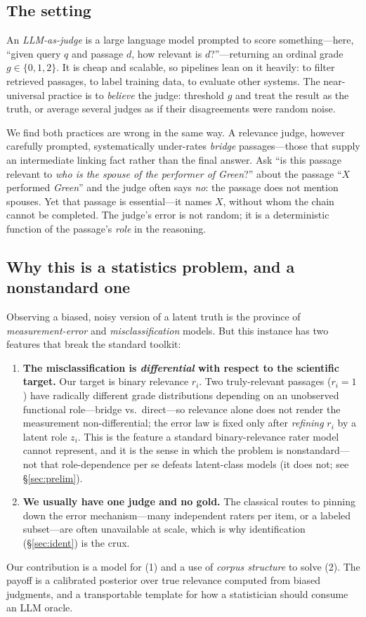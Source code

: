 \documentclass[11pt]{article}
\begin{document}
\subsection{The setting}
An \emph{LLM-as-judge} is a large language model prompted to score something---here, ``given query $q$ and
passage $d$, how relevant is $d$?''---returning an ordinal grade $g\in\{0,1,2\}$. It is cheap and scalable, so
pipelines lean on it heavily: to filter retrieved passages, to label training data, to evaluate other systems.
The near-universal practice is to \emph{believe} the judge: threshold $g$ and treat the result as the truth,
or average several judges as if their disagreements were random noise.

We find both practices are wrong in the same way. A relevance judge, however carefully prompted, systematically
under-rates \emph{bridge} passages---those that supply an intermediate linking fact rather than the final
answer. Ask ``is this passage relevant to \emph{who is the spouse of the performer of Green}?'' about the
passage ``$X$ performed \emph{Green}'' and the judge often says \emph{no}: the passage does not mention spouses.
Yet that passage is essential---it names $X$, without whom the chain cannot be completed. The judge's error is
not random; it is a deterministic function of the passage's \emph{role} in the reasoning.

\subsection{Why this is a statistics problem, and a nonstandard one}
Observing a biased, noisy version of a latent truth is the province of \emph{measurement-error} and
\emph{misclassification} models. But this instance has two features that break the standard toolkit:
\begin{enumerate}[leftmargin=*,itemsep=1pt]
  \item \textbf{The misclassification is \emph{differential} with respect to the scientific target.} Our target
  is binary relevance $r_i$. Two truly-relevant passages ($r_i{=}1$) have radically different grade
  distributions depending on an unobserved functional role---bridge vs.\ direct---so relevance alone does not
  render the measurement non-differential; the error law is fixed only after \emph{refining} $r_i$ by a latent
  role $z_i$. This is the feature a standard binary-relevance rater model cannot represent, and it is the sense
  in which the problem is nonstandard---not that role-dependence per se defeats latent-class models (it does
  not; see \S\ref{sec:prelim}).
  \item \textbf{We usually have one judge and no gold.} The classical routes to pinning down the error
  mechanism---many independent raters per item, or a labeled subset---are often unavailable at scale, which is
  why identification (\S\ref{sec:ident}) is the crux.
\end{enumerate}
Our contribution is a model for (1) and a use of \emph{corpus structure} to solve (2). The payoff is a
calibrated posterior over true relevance computed from biased judgments, and a transportable template for how a
statistician should consume an LLM oracle.
\end{document}
